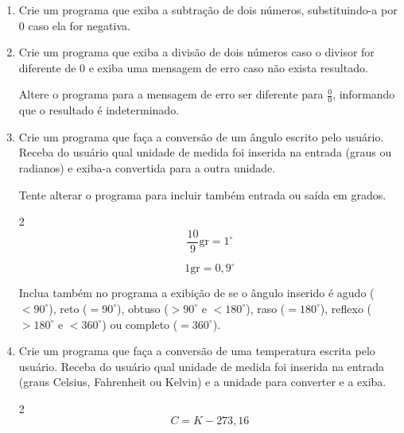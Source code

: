 \begin{enumerate}
	\modo{}{\color{white}}

	\item Crie um programa que exiba a subtração de dois números, substituindo-a por 0 caso ela for negativa.

	\item Crie um programa que exiba a divisão de dois números caso o divisor for diferente de 0 e exiba uma mensagem de erro caso não exista resultado.
	
	Altere o programa para a mensagem de erro ser diferente para $\frac{0}{0}$, informando que o resultado é indeterminado. 

\quebra

	\item Crie um programa que faça a conversão de um ângulo escrito pelo usuário. 
	Receba do usuário qual unidade de medida foi inserida na entrada (graus ou radianos)
	e exiba-a convertida para a outra unidade.
	
	Tente alterar o programa para incluir também entrada ou saída em grados.
	
	\begin{multicols}{2}	
		\begin{equation*}
			\frac{10}{9} \text{gr} = 1^\circ
		\end{equation*}
		
		\begin{equation*}
			1 \text{gr} = 0,9^\circ
		\end{equation*}
	\end{multicols}
	
	Inclua também no programa a exibição de se o ângulo inserido é agudo ($< 90^\circ$), reto ($= 90^\circ$), obtuso ($> 90^\circ$ e $< 180^\circ$), raso ($= 180^\circ$), reflexo ($> 180^\circ$ e $< 360^\circ$) ou completo ($= 360^\circ$).
	
	\item Crie um programa que faça a conversão de uma temperatura escrita pelo usuário.
	Receba do usuário qual unidade de medida foi inserida na entrada (graus Celsius, Fahrenheit ou Kelvin)
	e a unidade para converter e a exiba.	
	
	\begin{multicols}{2}	
		\begin{equation*}
			C = K - 273,16
		\end{equation*}
		

\end{multicols}
\end{enumerate}
